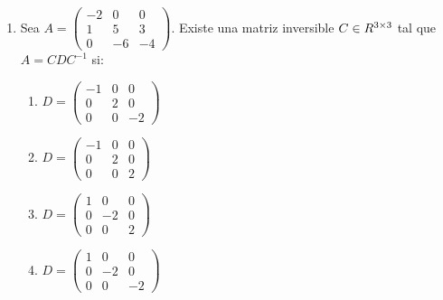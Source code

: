 \documentclass[../practica.root.tex]{subfiles}
\begin{document}
\begin{enumerate}
    \item Sea $A = \begin{pmatrix}
                  -2 & 0 & 0 \\ 1 & 5 & 3 \\ 0 & -6 & -4
              \end{pmatrix}$. Existe una matriz inversible $C \in R^{3\times3}$ tal que $A = CDC^{-1}$ si:
          \begin{enumerate}
              \item $ D = \begin{pmatrix}
                            -1 & 0 & 0  \\
                            0  & 2 & 0  \\
                            0  & 0 & -2
                        \end{pmatrix} $
              \item $ D = \begin{pmatrix}
                            -1 & 0 & 0 \\
                            0  & 2 & 0 \\
                            0  & 0 & 2
                        \end{pmatrix} $
              \item $ D = \begin{pmatrix}
                            1 & 0  & 0 \\
                            0 & -2 & 0 \\
                            0 & 0  & 2
                        \end{pmatrix} $
              \item $ D = \begin{pmatrix}
                            1 & 0  & 0  \\
                            0 & -2 & 0  \\
                            0 & 0  & -2
                        \end{pmatrix} $
          \end{enumerate}
\end{enumerate}
\end{document}
